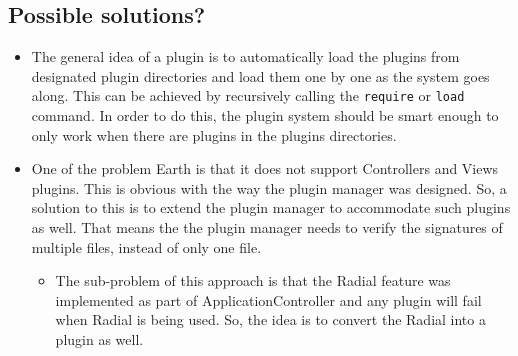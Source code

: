 \documentclass{article}
\begin{document}
\subsection*{Possible solutions?}

\begin{itemize}
	\item The general idea of a plugin is to automatically load the plugins from designated plugin directories and load them one by one as the system goes along. This can be achieved by recursively calling the \texttt{require} or \texttt{load} command. In order to do this, the plugin system should be smart enough to only work when there are plugins in the plugins directories. 
	\item One of the problem Earth is that it does not support Controllers and Views plugins. This is obvious with the way the plugin manager was designed. So, a solution to this is to extend the plugin manager to accommodate such plugins as well. That means the the plugin manager needs to verify the signatures of multiple files, instead of only one file. 
		\begin{itemize}
			\item The sub-problem of this approach is that the Radial feature was implemented as part of ApplicationController and any plugin will fail when Radial is being used. So, the idea is to convert the Radial into a plugin as well. 
		\end{itemize}
\end{itemize}
\end{document}
